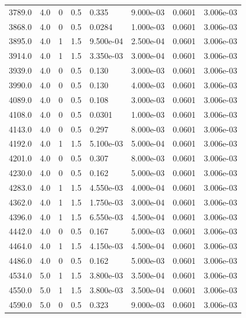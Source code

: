 \documentclass[preview]{standalone}
\begin{document}
{{{\begin{tabular}{L{1.2cm}C{1.2cm} C{0.3cm}C{0.5cm} C{1.4cm}C{1.4cm} C{1.4cm}C{1.4cm}}
  3789.0  &   4.0  & 0     & 0.5 &  0.335  & 9.000e-03  & 0.0601 &  3.006e-03   \\ 
  3868.0  &   4.0  & 0     & 0.5 &  0.0284  & 1.000e-03  & 0.0601 &  3.006e-03   \\ 
  3895.0  &   4.0  & 1     & 1.5 &  9.500e-04  & 2.500e-04  & 0.0601 &  3.006e-03   \\ 
  3914.0  &   4.0  & 1     & 1.5 &  3.350e-03  & 3.000e-04  & 0.0601 &  3.006e-03   \\ 
  3939.0  &   4.0  & 0     & 0.5 &  0.130  & 3.000e-03  & 0.0601 &  3.006e-03   \\ 
  3990.0  &   4.0  & 0     & 0.5 &  0.130  & 4.000e-03  & 0.0601 &  3.006e-03   \\ 
  4089.0  &   4.0  & 0     & 0.5 &  0.108  & 3.000e-03  & 0.0601 &  3.006e-03   \\ 
  4108.0  &   4.0  & 0     & 0.5 &  0.0301  & 1.000e-03  & 0.0601 &  3.006e-03   \\ 
  4143.0  &   4.0  & 0     & 0.5 &  0.297  & 8.000e-03  & 0.0601 &  3.006e-03   \\ 
  4192.0  &   4.0  & 1     & 1.5 &  5.100e-03  & 5.000e-04  & 0.0601 &  3.006e-03   \\ 
  4201.0  &   4.0  & 0     & 0.5 &  0.307  & 8.000e-03  & 0.0601 &  3.006e-03   \\ 
  4230.0  &   4.0  & 0     & 0.5 &  0.162  & 5.000e-03  & 0.0601 &  3.006e-03   \\ 
  4283.0  &   4.0  & 1     & 1.5 &  4.550e-03  & 4.000e-04  & 0.0601 &  3.006e-03   \\ 
  4362.0  &   4.0  & 1     & 1.5 &  1.750e-03  & 3.000e-04  & 0.0601 &  3.006e-03   \\ 
  4396.0  &   4.0  & 1     & 1.5 &  6.550e-03  & 4.500e-04  & 0.0601 &  3.006e-03   \\ 
  4442.0  &   4.0  & 0     & 0.5 &  0.167  & 5.000e-03  & 0.0601 &  3.006e-03   \\ 
  4464.0  &   4.0  & 1     & 1.5 &  4.150e-03  & 4.500e-04  & 0.0601 &  3.006e-03   \\ 
  4486.0  &   4.0  & 0     & 0.5 &  0.162  & 5.000e-03  & 0.0601 &  3.006e-03   \\ 
  4534.0  &   5.0  & 1     & 1.5 &  3.800e-03  & 3.500e-04  & 0.0601 &  3.006e-03   \\ 
  4550.0  &   5.0  & 1     & 1.5 &  3.800e-03  & 3.500e-04  & 0.0601 &  3.006e-03   \\ 
  4590.0  &   5.0  & 0     & 0.5 &  0.323  & 9.000e-03  & 0.0601 &  3.006e-03   \\ 

\end{tabular}}}}
\end{document}
